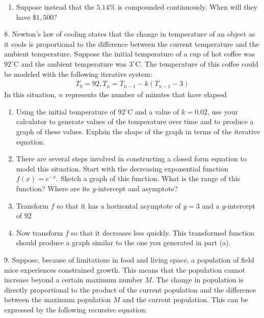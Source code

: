 \documentclass[10pt,]{book}
\theoremstyle{plain}
\theoremstyle{definition}
\theoremstyle{definition}
\theoremstyle{definition}
\numberwithin{equation}{section}
\begin{document}
\begin{exerciselist}
\begin{enumerate}[label=(\alph*)]
\item\hypertarget{li-150}{}Suppose instead that the \(5.14\%\) is compounded continuously. When will they have \(\$1,500\)?%
\end{enumerate}
\par\smallskip
\item[8.]\hypertarget{exercise-69}{}\hypertarget{p-265}{}%
Newton's law of cooling states that the change in temperature of an object as it cools is proportional to the difference between the current temperature and the ambient temperature.  Suppose the initial temperature of a cup of hot coffee was \(92^\circ\)C and the ambient temperature was \(3^\circ\)C.  The temperature of this coffee could be modeled with the following iterative system:%
%
\begin{gather*}
T_0 = 92,  T_n = T_{n-1} - k \left( T_{n-1} - 3 \right)
\end{gather*}
\hypertarget{p-266}{}%
In this situation, \(n\) represents the number of minutes that have elapsed%
\leavevmode%
\begin{enumerate}[label=(\alph*)]
\item\hypertarget{li-151}{}Using the initial temperature of \(92^\circ\)C and a value of \(k = 0.02\), use your calculator to generate values of the temperature over time and to produce a graph of these values.  Explain the shape of the graph in terms of the iterative equation.%
\item\hypertarget{li-152}{}There are several steps involved in constructing a closed form equation to model this situation.  Start with the decreasing exponential function \(f(x) = e^{-x}\).  Sketch a graph of this function.  What is the range of this function?  Where are its \(y\)-intercept and asymptote?%
\item\hypertarget{li-153}{}Transform \(f\) so that it has a horizontal asymptote of \(y=3\) and a \(y\)-intercept of \(92\)%
\item\hypertarget{li-154}{}Now transform \(f\) so that it decreases less quickly. This transformed function should produce a graph similar to the one you generated in part (a).%
\end{enumerate}
\par\smallskip
\item[9.]\hypertarget{exercise-70}{}\hypertarget{p-267}{}%
Suppose, because of limitations in food and living space, a population of field mice experiences constrained growth. This means that the population cannot increase beyond a certain maximum number \(M\).  The change in population is directly proportional to the product of the current population and the difference between the maximum population \(M\) and the current population.  This can be expressed by the following recursive equation:%

\end{exerciselist}
\end{document}

